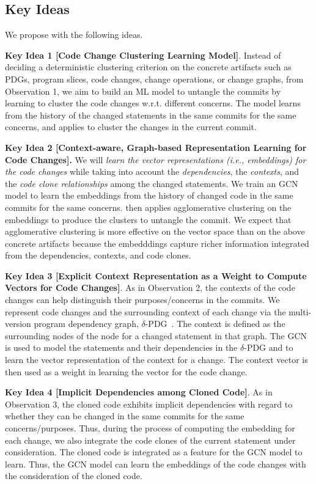 \subsection{Key Ideas}
\label{ideas:sec}

We propose {\tool} with the following ideas.


{\bf Key Idea 1 [Code Change Clustering Learning Model]}. Instead of
deciding a deterministic clustering criterion on the concrete
artifacts such as PDGs, program slices, code changes, change
operations, or change graphs, from Observation 1, we aim to build an
ML model to untangle the commits by learning to cluster the code
changes w.r.t. different concerns. The model learns from the
history of the changed statements in the same commits for the same
concerns, and applies to cluster the changes in the current commit.

{\bf Key Idea 2 [Context-aware, Graph-based Representation Learning
    for Code Changes].} We will {\em learn the vector representations
  (i.e., embeddings) for the code changes} while taking into account
the {\em dependencies}, the {\em contexts}, and the {\em code clone
  relationships} among the changed statements. We train an GCN model
to learn the embeddings from the history of changed code in the same
commits for the same concerns. {\tool} then applies agglomerative
clustering on the embeddings to produce the clusters to untangle the
commit. We expect that agglomerative clustering is more effective on
the vector space than on the above concrete artifacts because the
embedddings capture richer information integrated from the
dependencies, contexts, and code clones.


{\bf Key Idea 3 [Explicit Context Representation as a Weight to
    Compute Vectors for Code Changes]}. As in Observation 2, the
contexts of the code changes can help distinguish their
purposes/concerns in the commits. We represent code changes and the
surrounding context of each change via the multi-version program
dependency graph, $\delta$-PDG~\cite{flexeme-fse20}. The context is
defined as the surrounding nodes of the node for a changed statement
in that graph. The GCN is used to model the statements and their
dependencies in the $\delta$-PDG and to learn the vector
representation of the context for a change. The context vector is then
used as a weight in learning the vector for the code change.

{\bf Key Idea 4 [Implicit Dependencies among Cloned Code]}. As in
Observation 3, the cloned code exhibits implicit dependencies with
regard to whether they can be changed in the same commits for the same
concerns/purposes. Thus, during the process of computing the embedding
for each change, we also integrate the code clones of the current
statement under consideration. The cloned code is integrated as a
feature for the GCN model to learn. Thus, the GCN model can learn the
embeddings of the code changes with the consideration of the cloned
code.
